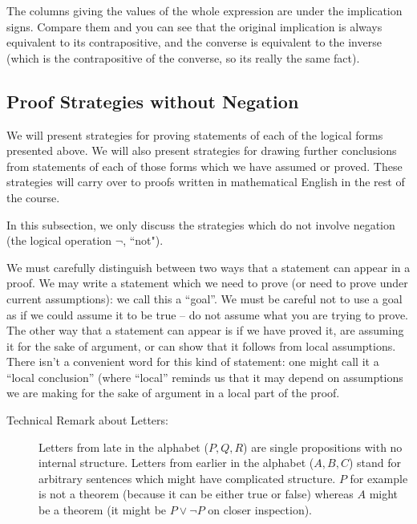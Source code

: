 \documentclass[12pt]{article}
\begin{document}
The columns giving the values of the whole expression are under the implication signs.  Compare them and you can see that the original implication is always equivalent to its contrapositive, and
the converse is equivalent to the inverse (which is the contrapositive of the converse, so its really the same fact).

\newpage

\subsection{Proof Strategies without Negation}

We will present strategies for proving statements of each of the
logical forms presented above.  We will also present strategies for
drawing further conclusions from statements of each of those forms
which we have assumed or proved.  These strategies will carry over to
proofs written in mathematical English in the rest of the course.

In this subsection, we only discuss the strategies which do not involve negation (the logical operation $\neg$, ``not").

We must carefully distinguish between two ways that a statement can
appear in a proof.  We may write a statement which we need to prove
(or need to prove under current assumptions): we call this a ``goal''.
We must be careful not to use a goal as if we could assume it to be
true -- do not assume what you are trying to prove.  The other way
that a statement can appear is if we have proved it, are assuming it
for the sake of argument, or can show that it follows from local
assumptions.  There isn't a convenient word for this kind of
statement: one might call it a ``local conclusion'' (where ``local''
reminds us that it may depend on assumptions we are making for the
sake of argument in a local part of the proof.

\begin{description}

\item[Technical Remark about Letters:]  Letters from late in the alphabet ($P,Q,R$) are single propositions with no internal structure.  Letters from earlier in the alphabet ($A,B,C$) stand for arbitrary sentences which might have complicated structure.  $P$ for example is not a theorem (because it can be either true or false) whereas $A$ might be a theorem
(it might be $P \vee \neg P$ on closer inspection).

\end{description}
\end{document}
